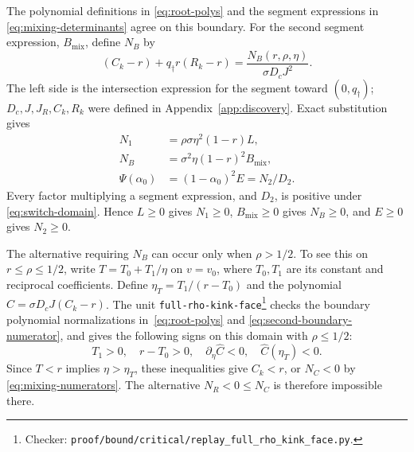 \documentclass[11pt]{article}
\theoremstyle{remark}
\theoremstyle{plain}
\begin{document}
The polynomial definitions in \eqref{eq:root-polys} and the
segment expressions in \eqref{eq:mixing-determinants} agree
on this boundary. For the second segment expression,
$B_{\mathrm{mix}}$, define $N_B$ by
\begin{equation}
 [q_\dagger(1-r)-J_R](C_k-r)+q_\dagger r(R_k-r)
       =\frac{N_B(r,\rho,\eta)}{\sigma D_cJ^2}.
 \label{eq:second-boundary-numerator}
\end{equation}
The left side is the intersection expression for the segment
toward $(0,q_\dagger)$; $D_c,J,J_R,C_k,R_k$ were defined in
Appendix~\ref{app:discovery}. Exact substitution gives
\begin{equation}
 \begin{aligned}
 N_1&=\rho\sigma\eta^2(1-r)L,\\
 N_B&=\sigma^2\eta(1-r)^2B_{\mathrm{mix}},\\
 \Psi(\alpha_0)&=(1-\alpha_0)^2E=N_2/D_2.
 \end{aligned}
 \label{eq:switch-polynomial-scales}
\end{equation}
Every factor multiplying a segment expression, and $D_2$, is positive
under \eqref{eq:switch-domain}. Hence $L\ge0$ gives $N_1\ge0$,
$B_{\mathrm{mix}}\ge0$ gives $N_B\ge0$, and $E\ge0$ gives $N_2\ge0$.

The alternative requiring $N_B$ can occur only when $\rho>1/2$.
To see this on $r\le\rho\le1/2$, write
$T=T_0+T_1/\eta$ on $v=v_0$, where $T_0,T_1$ are its constant
and reciprocal coefficients. Define
$\eta_T=T_1/(r-T_0)$ and the polynomial
$\widehat C=\sigma D_cJ(C_k-r)$.
The unit \nolinkurl{full-rho-kink-face}\footnote{Checker:
\nolinkurl{proof/bound/critical/replay_full_rho_kink_face.py}.\label{fn:checker-full-rho-kink-face}} checks the boundary
polynomial normalizations in~\eqref{eq:root-polys} and
\eqref{eq:second-boundary-numerator}, and gives the following
signs on this domain with $\rho\le1/2$:
\begin{equation}
 T_1>0,\quad r-T_0>0,\quad
 \partial_\eta\widehat C<0,\quad \widehat C(\eta_T)<0.
 \label{eq:small-switch-orientation}
\end{equation}
Since $T<r$ implies $\eta>\eta_T$, these inequalities give
$C_k<r$, or $N_C<0$ by \eqref{eq:mixing-numerators}.
The alternative $N_R<0\le N_C$ is therefore impossible there.
\end{document}
